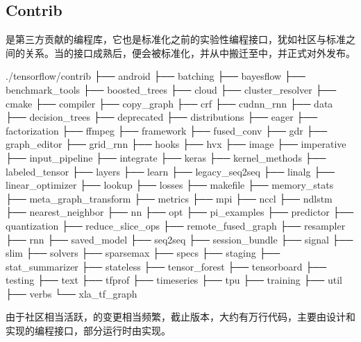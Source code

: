 \begin{content}
\subsection{Contrib}

是第三方贡献的编程库，它也是\tf{}标准化之前的实验性编程接口，犹如社区与标准之间的关系。当的接口成熟后，便会被\tf{}标准化，并从中搬迁至中，并正式对外发布。

\begin{leftbar}
\begin{python}[caption={Contrib源码结构}]
./tensorflow/contrib
├── android
├── batching
├── bayesflow
├── benchmark_tools
├── boosted_trees
├── cloud
├── cluster_resolver
├── cmake
├── compiler
├── copy_graph
├── crf
├── cudnn_rnn
├── data
├── decision_trees
├── deprecated
├── distributions
├── eager
├── factorization
├── ffmpeg
├── framework
├── fused_conv
├── gdr
├── graph_editor
├── grid_rnn
├── hooks
├── hvx
├── image
├── imperative
├── input_pipeline
├── integrate
├── keras
├── kernel_methods
├── labeled_tensor
├── layers
├── learn
├── legacy_seq2seq
├── linalg
├── linear_optimizer
├── lookup
├── losses
├── makefile
├── memory_stats
├── meta_graph_transform
├── metrics
├── mpi
├── nccl
├── ndlstm
├── nearest_neighbor
├── nn
├── opt
├── pi_examples
├── predictor
├── quantization
├── reduce_slice_ops
├── remote_fused_graph
├── resampler
├── rnn
├── saved_model
├── seq2seq
├── session_bundle
├── signal
├── slim
├── solvers
├── sparsemax
├── specs
├── staging
├── stat_summarizer
├── stateless
├── tensor_forest
├── tensorboard
├── testing
├── text
├── tfprof
├── timeseries
├── tpu
├── training
├── util
├── verbs
└── xla_tf_graph
\end{python}
\end{leftbar}

由于\tf{}社区相当活跃，的变更相当频繁，截止版本，大约有万行代码，主要由设计和实现的编程接口，部分运行时由实现。


\end{content}
